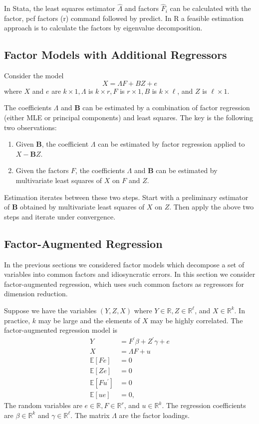 \documentclass[10pt]{article}
\begin{document}
In Stata, the least squares estimator $\widehat{\Lambda}$ and factors $\widehat{F}_{i}$ can be calculated with the factor, pcf factors (r) command followed by predict. In $\mathrm{R}$ a feasible estimation approach is to calculate the factors by eigenvalue decomposition.

\subsection{Factor Models with Additional Regressors}
Consider the model
$$
X=\Lambda F+B Z+e
$$
where $X$ and $e$ are $k \times 1, \Lambda$ is $k \times r, F$ is $r \times 1, B$ is $k \times \ell$, and $Z$ is $\ell \times 1$.

The coefficients $\Lambda$ and $\boldsymbol{B}$ can be estimated by a combination of factor regression (either MLE or principal components) and least squares. The key is the following two observations:

\begin{enumerate}
  \item Given $\boldsymbol{B}$, the coefficient $\Lambda$ can be estimated by factor regression applied to $X-\boldsymbol{B} Z$.

  \item Given the factors $F$, the coefficients $\Lambda$ and $\boldsymbol{B}$ can be estimated by multivariate least squares of $X$ on $F$ and $Z$.

\end{enumerate}
Estimation iterates between these two steps. Start with a preliminary estimator of $\boldsymbol{B}$ obtained by multivariate least squares of $X$ on $Z$. Then apply the above two steps and iterate under convergence.

\subsection{Factor-Augmented Regression}
In the previous sections we considered factor models which decompose a set of variables into common factors and idiosyncratic errors. In this section we consider factor-augmented regression, which uses such common factors as regressors for dimension reduction.

Suppose we have the variables $(Y, Z, X)$ where $Y \in \mathbb{R}, Z \in \mathbb{R}^{\ell}$, and $X \in \mathbb{R}^{k}$. In practice, $k$ may be large and the elements of $X$ may be highly correlated. The factor-augmented regression model is
$$
\begin{aligned}
Y &=F^{\prime} \beta+Z^{\prime} \gamma+e \\
X &=\Lambda F+u \\
\mathbb{E}[F e] &=0 \\
\mathbb{E}[Z e] &=0 \\
\mathbb{E}\left[F u^{\prime}\right] &=0 \\
\mathbb{E}[u e] &=0,
\end{aligned}
$$
The random variables are $e \in \mathbb{R}, F \in \mathbb{R}^{r}$, and $u \in \mathbb{R}^{k}$. The regression coefficients are $\beta \in \mathbb{R}^{k}$ and $\gamma \in \mathbb{R}^{\ell}$. The matrix $\Lambda$ are the factor loadings.
\end{document}
